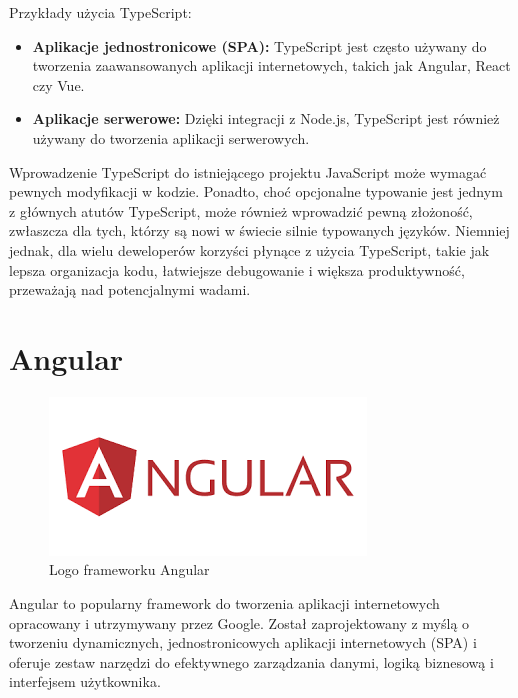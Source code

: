 Przykłady użycia TypeScript:

\begin{itemize}
\item \textbf{Aplikacje jednostronicowe (SPA):} TypeScript jest często używany do tworzenia zaawansowanych aplikacji internetowych, takich jak Angular, React czy Vue.

\item \textbf{Aplikacje serwerowe:} Dzięki integracji z Node.js, TypeScript jest również używany do tworzenia aplikacji serwerowych.
\end{itemize}

Wprowadzenie TypeScript do istniejącego projektu JavaScript może wymagać pewnych modyfikacji w kodzie. Ponadto, choć opcjonalne typowanie jest jednym z głównych atutów TypeScript, może również wprowadzić pewną złożoność, zwłaszcza dla tych, którzy są nowi w świecie silnie typowanych języków. Niemniej jednak, dla wielu deweloperów korzyści płynące z użycia TypeScript, takie jak lepsza organizacja kodu, łatwiejsze debugowanie i większa produktywność, przeważają nad potencjalnymi wadami.

\section{Angular}
\begin{figure}[h]
    \centering
    \includegraphics[width=0.6\linewidth]{./img/angular.png}
    \caption{Logo frameworku Angular}
    \label{fig:Angular}
\end{figure}
Angular to popularny framework do tworzenia aplikacji internetowych opracowany i utrzymywany przez Google. Został zaprojektowany z myślą o tworzeniu dynamicznych, jednostronicowych aplikacji internetowych (SPA) i oferuje zestaw narzędzi do efektywnego zarządzania danymi, logiką biznesową i interfejsem użytkownika.

